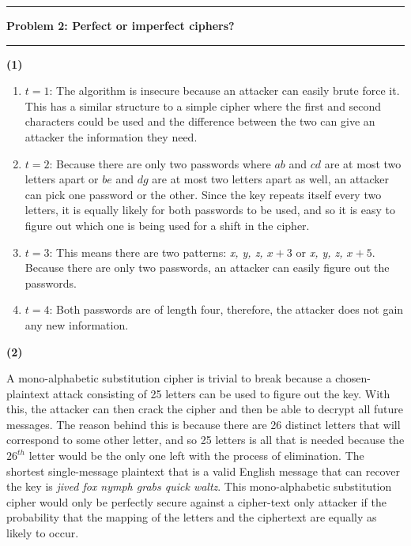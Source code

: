 \documentclass[11pt]{article}
\newcommand\question[2]{\vspace{.25in}\hrule\textbf{#1: #2}\vspace{.5em}\hrule\vspace{.10in}}
\renewcommand\part[1]{\vspace{.10in}\textbf{(#1)}\par}
\begin{document}
\question{Problem 2}{Perfect or imperfect ciphers?}
	\part{1} 
		\begin{enumerate}
			\item $t=1$: The algorithm is insecure because an attacker can easily brute force it. This has a similar structure to a simple cipher where the first and second characters could be used and the difference between the two can give an attacker the information they need.
			\item $t=2$: Because there are only two passwords where $ab$ and $cd$ are at most two letters apart or $be$ and $dg$ are at most two letters apart as well, an attacker can pick one password or the other. Since the key repeats itself every two letters, it is equally likely for both passwords to be used, and so it is easy to figure out which one is being used for a shift in the cipher.
			\item $t=3$: This means there are two patterns: \textit{x, y, z, $x + 3$} or \textit{x, y, z, $x+5$}. Because there are only two passwords, an attacker can easily figure out the passwords.
			\item $t=4$: Both passwords are of length four, therefore, the attacker does not gain any new information.
		\end{enumerate}

	\newpage 

	\part{2}
		A mono-alphabetic substitution cipher is trivial to break because a chosen-plaintext attack consisting of 25 letters can be used to figure out the key. With this, the attacker can then crack the cipher and then be able to decrypt all future messages. The reason behind this is because there are 26 distinct letters that will correspond to some other letter, and so 25 letters is all that is needed because the $26^{th}$ letter would be the only one left with the process of elimination. The shortest single-message plaintext that is a valid English message that can recover the key is \textit{jived fox nymph grabs quick waltz}. This mono-alphabetic substitution cipher would only be perfectly secure against a cipher-text only attacker if the probability that the mapping of the letters and the ciphertext are equally as likely to occur.
\end{document}

